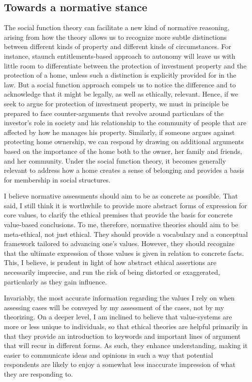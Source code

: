 \documentclass[12pt,a4paper]{book} %
\begin{document}
\subsection{Towards a normative stance}

The social function theory can facilitate a new kind of normative reasoning, arising from how the theory allows us to recognize more subtle distinctions between different kinds of property and different kinds of circumstances. For instance, staunch entitlements-based approach to autonomy will leave us with little room to differentiate between the protection of investment property and the protection of a home, unless such a distinction is explicitly provided for in the law. But a social function approach compels us to notice the difference and to acknowledge that it might be legally, as well as ethically, relevant. Hence, if we seek to argue for protection of investment property, we must in principle be prepared to face counter-arguments that revolve around particulars of the investor's role in society and his relationship to the community of people that are affected by how he manages his property. Similarly, if someone argues against protecting home ownership, we can respond by drawing on additional arguments based on the importance of the home both to the owner, her family and friends, and her community. Under the social function theory, it becomes generally relevant to address how a home creates a sense of belonging and provides a basis for membership in social structures.

I believe normative assessments should aim to be as concrete as possible. That said, I still think it is worthwhile to provide more abstract forms of expression for core values, to clarify the ethical premises that provide the basis for concrete value-based conclusions. To me, therefore, normative theories should aim to be meta-ethical, not just ethical. They should provide a vocabulary and a conceptual framework tailored to advancing one's values. However, they should recognize that the ultimate expression of those values is given in relation to concrete facts. This, I believe, is prudent in light of how abstract ethical assertions are necessarily imprecise, and run the risk of being distorted or exaggerated, particularly as they gain influence.

Invariably, the most accurate information regarding the values I rely on when assessing cases will be conveyed by my assessment of the cases, not by my theorizing. On a deeper level, I am inclined to believe that value-systems are more or less unique to individuals, so that ethical theories are helpful primarily in that they provide an introduction to keywords and important lines of argument that will recur in different forms. As such, they enhance understanding, making it easier to communicate ideas and opinions in such a way that potential respondents are likely to enjoy a somewhat less inaccurate impression of what they are responding to. 
\end{document}
